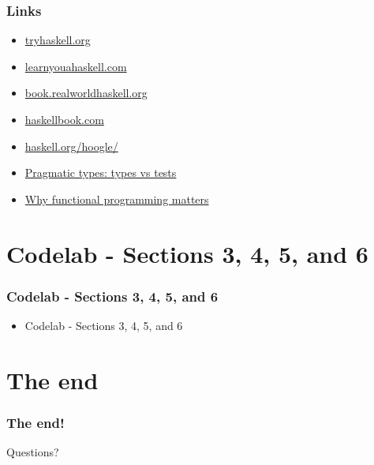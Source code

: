 \documentclass[17pt]{beamer}
\renewcommand{\(}[1]{\begin{columns}[#1]}
\renewcommand{\)}{\end{columns}}
\newcommand{\<}[1]{\begin{column}{#1}}
\renewcommand{\>}{\end{column}}
\begin{document}
\begin{frame}
  \frametitle{Links}
  \begin{itemize}
  \item \href{https://tryhaskell.org}{tryhaskell.org}
  \item \href{https://learnyouahaskell.com}{learnyouahaskell.com}
  \item \href{https://book.realworldhaskell.org}{book.realworldhaskell.org}
  \item \href{http://haskellbook.com}{haskellbook.com}
  \item \href{https://www.haskell.org/hoogle/}{haskell.org/hoogle/}
  \item \href{https://dev.to/stereobooster/pragmatic-types-type-systems-vs-tests-4k3e}{Pragmatic types: types vs tests}
  \item \href{https://www.cs.kent.ac.uk/people/staff/dat/miranda/whyfp90.pdf}{Why functional programming matters}
  \end{itemize}
\end{frame}


\section{Codelab - Sections 3, 4, 5, and 6}

\begin{frame}
  \frametitle{Codelab - Sections 3, 4, 5, and 6}
  \begin{itemize}
    \item Codelab - Sections 3, 4, 5, and 6
  \end{itemize}
\end{frame}


\section{The end}

\begin{frame}
  \frametitle{The end!}
  \begin{center}
    Questions?
  \end{center}
\end{frame}

\end{document}
